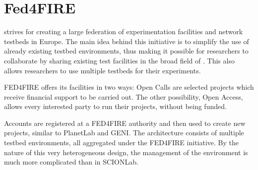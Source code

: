 \section{Fed4FIRE}

 strives for creating a large federation of experimentation facilities and network testbeds in Europe. The main idea behind this initiative is to simplify the use of already existing testbed environments, thus making it possible for researchers to collaborate by sharing existing test facilities in the broad field of . This also allows researchers to use multiple testbeds for their experiments. \cite{fire_book}

FED4FIRE offers its facilities in two ways: Open Calls are selected projects which receive financial support to be carried out. The other possibility, Open Access, allows every interested party to run their projects, without being funded.

Accounts are registered at a FED4FIRE authority and then used to create new projects, similar to PlanetLab and GENI. The architecture consists of multiple testbed environments, all aggregated under the FED4FIRE initiative. By the nature of this very heterogeneous design, the management of the environment is much more complicated than in SCIONLab. \cite{fire_book}